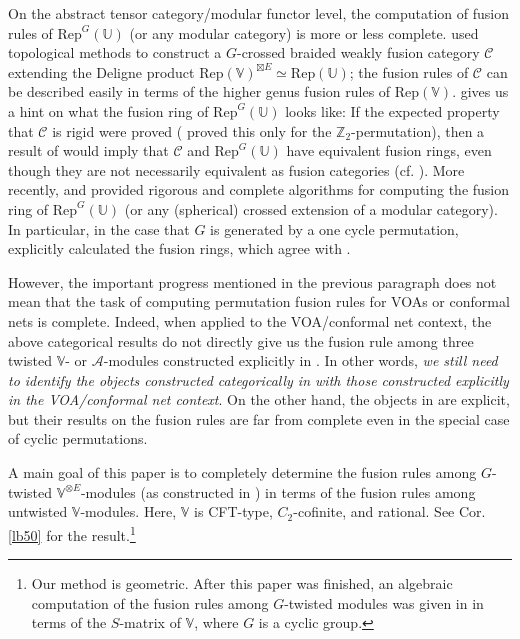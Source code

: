 \documentclass[11pt,b5paper,notitlepage]{article}
\theoremstyle{definition}
\theoremstyle{plain}
\newcommand{\mc}{\mathcal}
\newcommand{\Rep}{\mathrm{Rep}}
\newcommand{\scr}{\mathscr}
\newcommand{\mbb}{\mathbb}
\newcommand{\Vbb}{\mathbb V}
\newcommand{\Ubb}{\mathbb U}
\newcommand{\Zbb}{\mathbb Z}
\numberwithin{equation}{subsection}
\begin{document}
On the abstract tensor category/modular functor level, the computation of fusion rules of $\Rep^G(\Ubb)$ (or any modular category) is more or less complete. \cite{BS11} used topological methods to construct a $G$-crossed  braided weakly fusion category $\scr C$ extending the Deligne product $\Rep(\Vbb)^{\boxtimes E}\simeq\Rep(\Ubb)$;  the fusion rules of $\scr C$ can be described easily in terms of the higher genus fusion rules of $\Rep(\Vbb)$. \cite{BS11} gives us a hint on what the fusion ring of $\Rep^G(\Ubb)$ looks like: If the expected property that $\scr C$ is rigid were proved (\cite{BS11} proved this only for the $\Zbb_2$-permutation), then a result of \cite{ENO10} would imply that $\scr C$ and $\Rep^G(\Ubb)$ have equivalent fusion rings, even though they are not necessarily equivalent as fusion categories (cf. \cite{Bis20,EG18}).
More recently, \cite{BJ19} and \cite{Del19} provided rigorous and complete algorithms for computing the fusion ring of $\Rep^G(\Ubb)$ (or any (spherical) crossed extension of a modular category). In particular, in the case that $G$ is generated by a one cycle permutation, \cite{BJ19} explicitly calculated the fusion rings, which agree with \cite{BS11}.


However, the important progress mentioned in the previous paragraph does not mean that the task of computing permutation fusion rules for VOAs or conformal nets is complete. Indeed,  when applied to the VOA/conformal net context, the above categorical results do not directly give us the fusion rule among three twisted $\Vbb$- or $\mc A$-modules constructed explicitly in \cite{BDM02,LX04,KLX05}.  In other words, \textit{we still need to identify the objects constructed categorically in \cite{BS11,BJ19,Del19} with those constructed explicitly in the VOA/conformal net context}. On the other hand, the objects in \cite{LX04,KLX05,DLXY24} are explicit, but their results on the fusion rules are  far from complete even in the special case of cyclic permutations.

A main goal of this paper is to completely determine the fusion rules among $G$-twisted $\Vbb^{\otimes E}$-modules (as constructed in \cite{BDM02}) in terms of the fusion rules among untwisted $\Vbb$-modules. Here,  $\Vbb$ is CFT-type, $C_2$-cofinite, and rational. See Cor. \ref{lb50} for the result.\footnote{Our method is geometric. After this paper was finished, an algebraic computation of the fusion rules among $G$-twisted modules was given in \cite{DXY24} in terms of the $S$-matrix of $\Vbb$, where $G$ is a cyclic group.}
\end{document}
